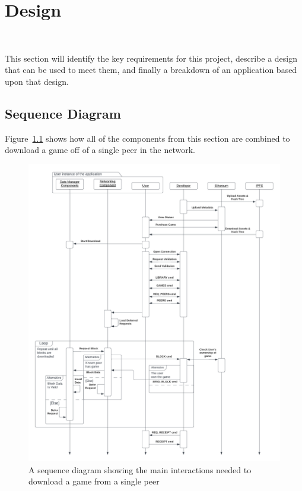 \chapter{Design}~\label{ch:design}

\noindent
This section will identify the key requirements for this project, describe a design that can be used to meet them, and finally a breakdown of an application based upon that design.




\newpage


\newpage
\section{Sequence Diagram}

Figure~\ref{fig:p2p-interactions} shows how all of the components from this section are combined to download a game off of a single peer in the network.

\begin{figure}[H]
  \centering\hspace{-16.5mm}
  \includegraphics[width=1.1\textwidth]{assets/images/diagrams/p2p-sequence.png}
  \caption{A sequence diagram showing the main interactions needed to download a game from a single peer}
  \label{fig:p2p-interactions}
\end{figure}




